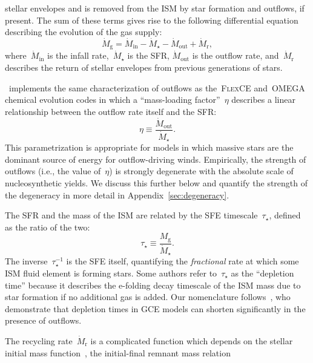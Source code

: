 stellar envelopes and is removed from the ISM by star formation and outflows,
if present.
The sum of these terms gives rise to the following differential equation
describing the evolution of the gas supply:
\begin{equation}
\dot{M}_\text{g} = \dot{M}_\text{in} - \dot{M}_\star - \dot{M}_\text{out}
+ \dot{M}_\text{r},
\label{eq:mdotgas}
\end{equation}
where~$\dot{M}_\text{in}$ is the infall rate,~$\dot{M}_\star$ is the SFR,
$\dot{M}_\text{out}$ is the outflow rate, and~$\dot{M}_\text{r}$ describes
the return of stellar envelopes from previous generations of stars.
\par
\vice~implements the same characterization of outflows as the~\textsc{FlexCE}
\citep{Andrews2017} and~\textsc{OMEGA}~\citep{Cote2017} chemical evolution
codes in which a ``mass-loading factor''~$\eta$ describes a linear relationship
between the outflow rate itself and the SFR:
\begin{equation}
\eta \equiv \frac{\dot{M}_\text{out}}{\dot{M}_\star}.
\label{eq:massloading}
\end{equation}
This parametrization is appropriate for models in which massive stars are the
dominant source of energy for outflow-driving winds.
Empirically, the strength of outflows (i.e., the value of~$\eta$) is strongly
degenerate with the absolute scale of nucleosynthetic yields.
We discuss this further below and quantify the strength of the degeneracy in
more detail in Appendix~\ref{sec:degeneracy}.
\par
The SFR and the mass of the ISM are related by the SFE timescale~$\tau_\star$,
defined as the ratio of the two:
\begin{equation}
\tau_\star \equiv \frac{M_\text{g}}{\dot{M}_\star}.
\label{eq:taustar}
\end{equation}
The inverse~$\tau_\star^{-1}$ is the SFE itself, quantifying the
\textit{fractional} rate at which some ISM fluid element is forming stars.
Some authors refer to~$\tau_\star$ as the ``depletion time''
\citep[e.g.,][]{Tacconi2018} because it describes the e-folding decay timescale
of the ISM mass due to star formation if no additional gas is added.
Our nomenclature follows~\citet{Weinberg2017b}, who demonstrate that depletion
times in GCE models can shorten significantly in the presence of outflows.
\par
The recycling rate~$\dot{M}_\text{r}$ is a complicated function which depends
on the stellar initial mass function~\citep[IMF; e.g.,][]{Salpeter1955,
Miller1979, Kroupa2001, Chabrier2003}, the initial-final remnant mass relation
